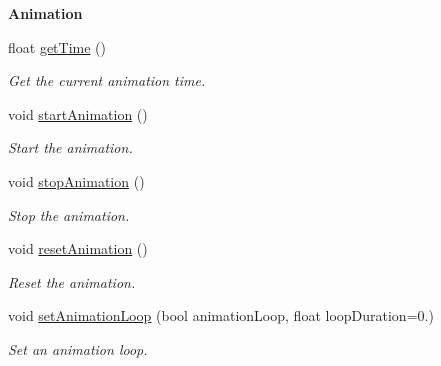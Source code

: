 \begin{Indent}{\bf Animation}\par
\begin{DoxyCompactItemize}
\item 
float \hyperlink{classViewer_aa4065ecafe1008b63ebd3b4a84c65557}{get\+Time} ()
\begin{DoxyCompactList}\small\item\em Get the current animation time. \end{DoxyCompactList}\item 
void \hyperlink{classViewer_a912259c3206eed1ebc1d24f7425e99cd}{start\+Animation} ()
\begin{DoxyCompactList}\small\item\em Start the animation. \end{DoxyCompactList}\item 
void \hyperlink{classViewer_abc1c9b7f6d564861aeab9be3b320bb44}{stop\+Animation} ()
\begin{DoxyCompactList}\small\item\em Stop the animation. \end{DoxyCompactList}\item 
void \hyperlink{classViewer_a268b0edf15bee6137d617743d3330d1e}{reset\+Animation} ()
\begin{DoxyCompactList}\small\item\em Reset the animation. \end{DoxyCompactList}\item 
void \hyperlink{classViewer_aaf65e6b104d3202c24a5760cb273b144}{set\+Animation\+Loop} (bool animation\+Loop, float loop\+Duration=0.)
\begin{DoxyCompactList}\small\item\em Set an animation loop. \end{DoxyCompactList}\end{DoxyCompactItemize}
\end{Indent}
